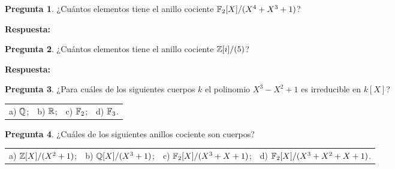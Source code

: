 \documentclass{article}
\theoremstyle{definition}
\newtheorem{pregunta}{Pregunta}
\begin{document}
\vspace{3em}


\begin{pregunta}
  ¿Cuántos elementos tiene el anillo cociente $\mathbb{F}_2 [X]/(X^4 + X^3 + 1)$?
\end{pregunta}

\noindent\textbf{Respuesta:}

\vspace{3em}


\begin{pregunta}
  ¿Cuántos elementos tiene el anillo cociente $\mathbb{Z}[i]/(5)$?
\end{pregunta}

\noindent\textbf{Respuesta:}

\pagebreak

\begin{pregunta}
  ¿Para cuáles de los siguientes cuerpos $k$ el polinomio $X^3 - X^2 + 1$ es
  irreducible en $k [X]$?

  \begin{center}
    \begin{tabular}{x{3cm}x{3cm}x{3cm}x{3cm}}
      a) $\mathbb{Q}$; & b) $\mathbb{R}$; & c) $\mathbb{F}_2$; & d) $\mathbb{F}_3$.
    \end{tabular}
  \end{center}
\end{pregunta}

\vspace{3em}

\begin{pregunta}
  ¿Cuáles de los siguientes anillos cociente son cuerpos?

  \begin{center}
    \begin{tabular}{x{3cm}x{3cm}x{4cm}x{4.5cm}}
      a) $\mathbb{Z}[X]/(X^2+1)$; & b) $\mathbb{Q}[X]/(X^3+1)$; & c) $\mathbb{F}_2[X]/(X^3+X+1)$; & d) $\mathbb{F}_2[X]/(X^3+X^2+X+1)$.
    \end{tabular}
  \end{center}
\end{pregunta}

\vspace{3em}
\end{document}
